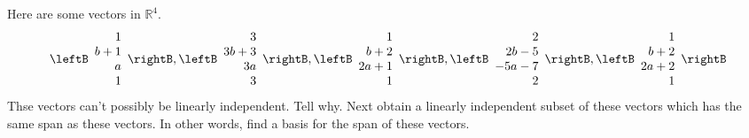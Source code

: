 \begin{enumialphparenastyle}
\begin{ex} Here are some vectors in $\mathbb{R}^{4}$. 
\begin{equation*}
\leftB 
\begin{array}{r}
1 \\ 
b+1 \\ 
a \\ 
1
\end{array}
\rightB ,\leftB 
\begin{array}{r}
3 \\ 
3b+3 \\ 
3a \\ 
3
\end{array}
\rightB ,\leftB 
\begin{array}{r}
1 \\ 
b+2 \\ 
2a+1 \\ 
1
\end{array}
\rightB ,\leftB 
\begin{array}{r}
2 \\ 
2b-5 \\ 
-5a-7 \\ 
2
\end{array}
\rightB ,\leftB 
\begin{array}{r}
1 \\ 
b+2 \\ 
2a+2 \\ 
1
\end{array}
\rightB
\end{equation*}
Thse vectors can't possibly be linearly independent. Tell why. Next obtain a
linearly independent subset of these vectors which has the same span as
these vectors. In other words, find a basis for the span of these vectors.
\end{ex}

\end{enumialphparenastyle}
